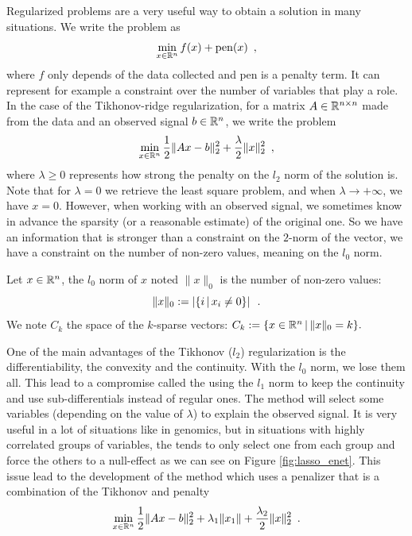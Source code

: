 \documentclass{article}
\begin{document}
Regularized problems are a very useful way to obtain a solution in many situations. We write the problem as 
\[\min_{x\in\mathbb{R}^n} f(x) + \mathrm{pen}(x)\enspace,\]
where $f$ only depends of the data collected and $\mathrm{pen}$ is a penalty term. It can represent for example a constraint over the number of variables that play a role.
In the case of the Tikhonov-ridge regularization, for a matrix $A\in\mathbb{R}^{n\times n}$ made from the data and an observed signal $b\in\mathbb{R}^n$, we write the problem
\[\min_{x\in\mathbb{R}^n} \frac{1}{2}\|Ax-b\|^2_2 + \frac{\lambda}{2}\|x\|^2_2\enspace,\]
where $\lambda \geq 0$ represents how strong the penalty on the $l_2$ norm of the solution is. Note that for $\lambda = 0$ we retrieve the least square problem, and when $\lambda\rightarrow +\infty$, we have $x=0$.
However, when working with an observed signal, we sometimes know in advance the sparsity (or a reasonable estimate) of the original one. So we have an information that is stronger than a constraint on the $2$-norm of the vector, we have a constraint on the number of non-zero values, meaning on the $l_0$ norm.

\begin{definition}
Let $x\in\mathbb{R}^n$, the $l_0$ norm of $x$ noted $\|x\|_0$ is the number of non-zero values: \[\|x\|_0:=\left|\{i\,|\, x_i\neq 0\}\right|\enspace .\]
We note $C_k$ the space of the $k$-sparse vectors: $C_k := \{x\in\mathbb{R}^n\,|\, \|x\|_0 = k\}.$
\end{definition}

One of the main advantages of the Tikhonov ($l_2$) regularization is the differentiability, the convexity and the continuity. With the $l_0$ norm, we lose them all. This lead to a compromise called the \lasso using the $l_1$ norm to keep the continuity and use sub-differentials instead of regular ones. The \lasso method will select some variables (depending on the value of $\lambda$) to explain the observed signal. It is very useful in a lot of situations like in genomics, but in situations with highly correlated groups of variables, the \lasso tends to only select one from each group and force the others to a null-effect as we can see on Figure \ref{fig:lasso_enet}. This issue lead to the development of the \enet method which uses a penalizer that is a combination of the Tikhonov and \lasso penalty
\[\min_{x\in\mathbb{R}^n} \frac{1}{2}\|Ax-b\|^2_2 + \lambda_1 \|x_1\| +  \frac{\lambda_2}{2}\|x\|^2_2\enspace.\]
\end{document}
